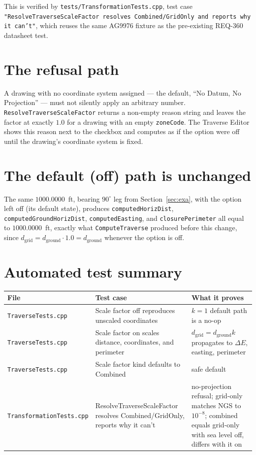 \documentclass[11pt]{article}
\begin{document}
This is verified by \texttt{tests/TransformationTests.cpp}, test case
\texttt{"ResolveTraverseScaleFactor resolves Combined/GridOnly and reports
why it can't"}, which reuses the same AG9976 fixture as the pre-existing
REQ-360 datasheet test.

\section{The refusal path}

A drawing with no coordinate system assigned --- the default, ``No Datum,
No Projection'' --- must not silently apply an arbitrary number.
\texttt{ResolveTraverseScaleFactor} returns a non-empty reason string and
leaves the factor at exactly $1.0$ for a drawing with an empty
\texttt{zoneCode}. The Traverse Editor shows this reason next to the
checkbox and computes as if the option were off until the drawing's
coordinate system is fixed.

\section{The default (off) path is unchanged}

The same $1000.0000$~ft, bearing $90^{\circ}$ leg from
Section~\ref{sec:exa}, with the option left off (its default state),
produces \texttt{computedHorizDist}, \texttt{computedGroundHorizDist},
\texttt{computedEasting}, and \texttt{closurePerimeter} all equal to
$1000.0000$~ft, exactly what \texttt{ComputeTraverse} produced before this
change, since $d_{\mathrm{grid}} = d_{\mathrm{ground}} \cdot 1.0 =
d_{\mathrm{ground}}$ whenever the option is off.

\section{Automated test summary}

\begin{center}
\small
\begin{tabular}{@{}L{0.27\textwidth}L{0.37\textwidth}L{0.28\textwidth}@{}}
\toprule
File & Test case & What it proves \\
\midrule
\texttt{TraverseTests.cpp} &
  Scale factor off reproduces unscaled coordinates &
  $k=1$ default path is a no-op \\[0.3em]
\texttt{TraverseTests.cpp} &
  Scale factor on scales distance, coordinates, and perimeter &
  $d_{\mathrm{grid}}=d_{\mathrm{ground}}k$ propagates to $\Delta E$, easting, perimeter \\[0.3em]
\texttt{TraverseTests.cpp} &
  Scale factor kind defaults to Combined &
  safe default \\[0.3em]
\texttt{TransformationTests.cpp} &
  ResolveTraverseScaleFactor resolves Combined/GridOnly, reports why it can't &
  no-projection refusal; grid-only matches NGS to $10^{-8}$; combined equals grid-only with sea level off, differs with it on \\
\bottomrule
\end{tabular}
\end{center}
\end{document}
